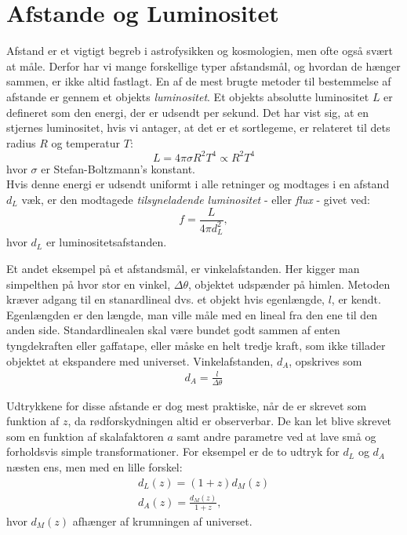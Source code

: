 \section{Afstande og Luminositet}
Afstand er et vigtigt begreb i astrofysikken og kosmologien, men ofte også svært at måle. Derfor har vi mange forskellige typer afstandsmål, og hvordan de hænger sammen, er ikke altid fastlagt. En af de mest brugte metoder til bestemmelse af afstande er gennem et objekts \textit{luminositet}. Et objekts absolutte luminositet $L$ er defineret som den energi, der er udsendt per sekund. Det har vist sig, at en stjernes luminositet, hvis vi antager, at det er et sortlegeme, er relateret til dets radius $R$ og temperatur $T$:
\begin{equation}
L = 4\pi\sigma R^2T^4 \propto R^2 T^4
\end{equation}
hvor $\sigma$ er Stefan-Boltzmann's konstant. \\
Hvis denne energi er udsendt uniformt i alle retninger og modtages i en afstand $d_L$ væk, er den modtagede \textit{tilsyneladende luminositet} - eller \emph{flux} - givet ved:
\begin{equation}
f = \frac{L}{4\pi d_L^2},
\end{equation}
hvor $d_L$ er luminositetsafstanden. 

Et andet eksempel på et afstandsmål, er vinkelafstanden. Her kigger man simpelthen på hvor stor en vinkel, $\Delta \theta$, objektet udspænder på himlen. Metoden kræver adgang til en stanardlineal dvs. et objekt hvis egenlængde, $l$, er kendt. Egenlængden er den længde, man ville måle med en lineal fra den ene til den anden side. Standardlinealen skal være bundet godt sammen af enten tyngdekraften eller gaffatape, eller måske en helt tredje kraft, som ikke tillader objektet at ekspandere med universet.  Vinkelafstanden, $d_A$, opskrives som
\begin{align}
	d_A=\frac{l}{\Delta \theta}
\end{align}

Udtrykkene for disse afstande er dog mest praktiske, når de er skrevet som funktion af $z$, da rødforskydningen altid er observerbar. De kan let blive skrevet som en funktion af skalafaktoren $a$ samt andre parametre ved at lave små og forholdsvis simple transformationer. For eksempel er de to udtryk for $d_L$ og $d_A$ næsten ens, men med en lille forskel:
\begin{align}
d_L(z) = (1+z)d_M(z) \\
d_A(z) =\frac{d_M(z)}{1+z},
\end{align}
hvor $d_M(z)$ afhænger af krumningen af universet.


